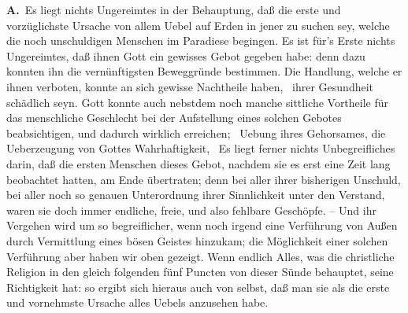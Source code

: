 \vabst {}\par\noindent
\vabst \textbf{A.}~Es liegt nichts Ungereimtes in der Behauptung, daß die erste und vorzüglichste Ursache von allem Uebel auf Erden in jener  zu suchen sey, welche die noch unschuldigen Menschen im Paradiese begingen. Es ist für's Erste nichts Ungereimtes, daß ihnen Gott ein gewisses Gebot gegeben habe: denn dazu konnten ihn die vernünftigsten Beweggründe bestimmen. Die Handlung, welche er ihnen verboten, konnte an sich gewisse Nachtheile haben, \zB\ ihrer Gesundheit schädlich seyn. Gott konnte auch nebstdem noch manche sittliche Vortheile für das menschliche Geschlecht bei der Aufstellung eines solchen Gebotes beabsichtigen, und dadurch wirklich erreichen; \zB\ Uebung ihres Gehorsames, die Ueberzeugung von Gottes Wahrhaftigkeit, \usw\ Es liegt ferner nichts Unbegreifliches darin, daß die ersten Menschen dieses Gebot, nachdem sie es erst eine Zeit lang beobachtet hatten, am Ende übertraten; denn bei aller ihrer bisherigen Unschuld, bei aller noch so genauen Unterordnung ihrer Sinnlichkeit unter den Verstand, waren sie doch immer endliche, freie, und also fehlbare Geschöpfe. -- Und ihr Vergehen wird um so begreiflicher, wenn noch irgend eine Verführung von Außen durch Vermittlung eines bösen Geistes hinzukam; die Möglichkeit einer solchen Verführung aber haben wir oben gezeigt. Wenn endlich Alles, was die christliche Religion in den gleich folgenden fünf Puncten von dieser Sünde behauptet, seine Richtigkeit hat: so ergibt sich hieraus auch von selbst, daß man sie als die erste und vornehmste Ursache alles Uebels anzusehen habe.

